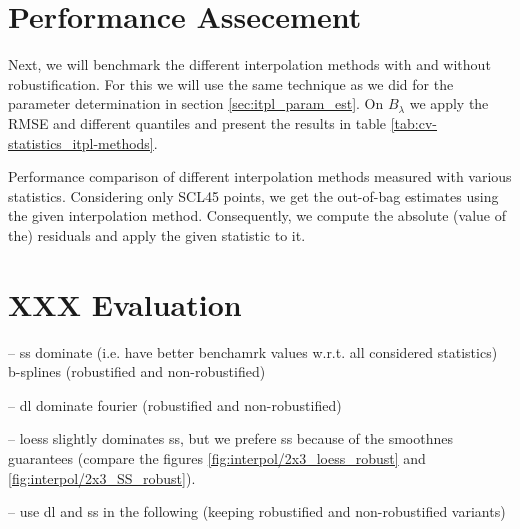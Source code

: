 \section{Performance Assecement}{
	Next, we will benchmark the different interpolation methods with and without robustification. For this we will use the same technique as we did for the parameter determination in section \ref{sec:itpl_param_est}. On $B_\lambda$ we apply the RMSE and different quantiles and present the results in table \ref{tab:cv-statistics_itpl-methods}. 


	\begin{table}
		\begin{center}
			\caption{Performance comparison of different interpolation methods measured with various statistics. Considering only SCL45 points, we get the out-of-bag estimates using the given interpolation method. Consequently, we compute the absolute (value of the) residuals and apply the given statistic to it.}
			\small
			
			\normalsize
			\label{tab:cv-statistics_itpl-methods}
		\end{center}
	\end{table}
}

\section{XXX Evaluation}
-- ss dominate (i.e. have better benchamrk values w.r.t. all considered statistics) b-splines (robustified and non-robustified)

-- dl dominate fourier (robustified and non-robustified)

-- loess slightly dominates ss, but we prefere ss because of the smoothnes guarantees (compare the figures \ref{fig:interpol/2x3_loess_robust} and \ref{fig:interpol/2x3_SS_robust}).

-- use dl and ss in the following (keeping robustified and non-robustified variants)


